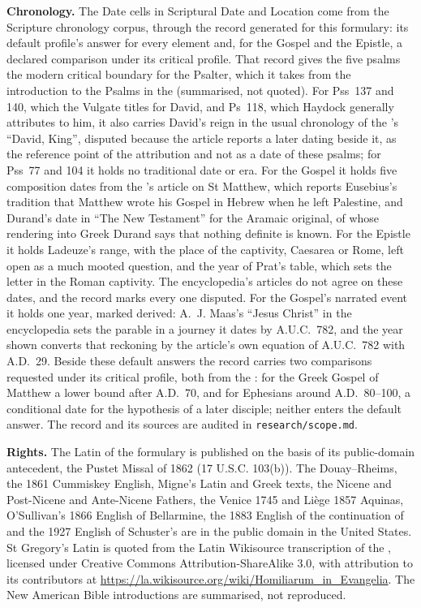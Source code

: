 {\textbf{Chronology.} The Date cells in Scriptural Date and Location come from
the Scripture chronology corpus, through the record generated for this
formulary: its default profile's answer for every element and, for the Gospel
and the Epistle, a declared comparison under its critical profile. That record gives the five psalms the
modern critical boundary for the Psalter, which it takes from the introduction
to the Psalms in the  (summarised,
not quoted). For Pss~137 and 140, which the Vulgate titles for David, and
Ps~118, which Haydock generally attributes to him, it also
carries David's reign in the usual chronology of the 's ``David, King'', disputed because the article reports a later
dating beside it, as the reference point of the attribution and not as a date
of these psalms; for Pss~77 and 104 it holds no traditional date or era.
For the Gospel it holds five composition dates from the 's article on St Matthew, which reports Eusebius's tradition that
Matthew wrote his Gospel in Hebrew when he left Palestine, and Durand's date in
``The New Testament'' for the Aramaic original, of whose rendering into Greek
Durand says that nothing definite is known. For the Epistle it holds Ladeuze's
range, with the place of the captivity, Caesarea or Rome, left open as a much
mooted question, and the year of Prat's table, which sets the letter in the
Roman captivity. The encyclopedia's articles do not agree on these dates, and
the record marks every one disputed. For the Gospel's narrated event it holds
one year, marked derived: A.~J. Maas's ``Jesus Christ'' in the encyclopedia
sets the parable in a journey it dates by A.U.C.~782, and the year shown
converts that reckoning by the article's own equation of A.U.C.~782 with
A.D.~29. Beside these default answers the record
carries two comparisons requested under its critical profile, both from the
: for the Greek Gospel of Matthew a
lower bound after A.D.~70, and for Ephesians around A.D.~80--100, a conditional
date for the hypothesis of a later disciple; neither enters the default answer.
The record and its sources are audited in \texttt{research/scope.md}.

\textbf{Rights.} The Latin of the formulary is published on the basis of its
public-domain antecedent, the Pustet Missal of 1862 (17 U.S.C. 103(b)). The
Douay--Rheims, the 1861 Cummiskey English, Migne's Latin and Greek texts, the
Nicene and Post-Nicene and Ante-Nicene Fathers, the Venice 1745 and Liège 1857
Aquinas, O'Sullivan's 1866 English of Bellarmine, the 1883 English of the
continuation of  and the 1927 English of Schuster's
 are in the public domain in the United States. St Gregory's
Latin is quoted from the Latin Wikisource transcription of the
, licensed under Creative Commons
Attribution-ShareAlike 3.0, with attribution to its contributors at
\url{https://la.wikisource.org/wiki/Homiliarum_in_Evangelia}. The New American
Bible introductions are summarised, not reproduced.

}

